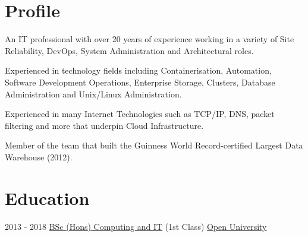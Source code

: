 \documentclass[a4paper]{tenseconds} %
\begin{document}
\makeprofile %

\section{Profile}
\textnormal{\faInfo} An IT professional with over 20 years of experience working in a variety of Site Reliability, DevOps, System Administration and Architectural roles.

\textnormal{\faInfo} Experienced in technology fields including Containerisation, Automation, Software Development Operations, Enterprise Storage, Clusters, Database Administration and Unix/Linux Administration.

\textnormal{\faInfo} Experienced in many Internet Technologies such as TCP/IP, DNS, packet filtering and more that underpin Cloud Infrastructure.

\textnormal{\textcolor{materialamber}{\faTrophy}} Member of the team that built the Guinness World Record-certified Largest Data Warehouse (2012).



\section{Education}
\begin{twenty} %
	\twentyitem
	{2013 - 2018}
	{}
	{\href{http://www.open.ac.uk/courses/computing-it/degrees/bsc-computing-it-q62}{BSc (Hons) Computing and IT} \textnormal{(1st Class)}}
	{\href{http://www.open.ac.uk}{Open University}}
	{}
	{}
\end{twenty}
\end{document}
